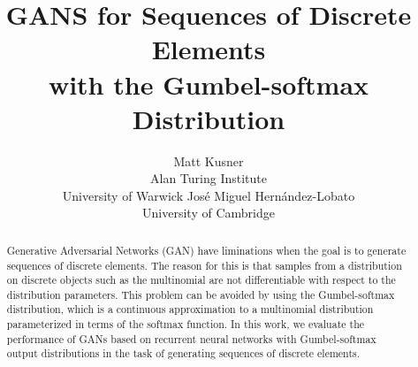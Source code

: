 \documentclass{article}
\title{GANS for Sequences of Discrete Elements \\with the Gumbel-softmax Distribution}
\author{
    Matt Kusner\\
    Alan Turing Institute\\
    University of Warwick
    \And
    Jos\'e Miguel Hern\'andez-Lobato\\
    University of Cambridge
}
\begin{document}

\maketitle

\begin{abstract}
Generative Adversarial Networks (GAN) have liminations when the goal is to
generate sequences of discrete elements. The reason for this is that
samples from a distribution on discrete objects such as the multinomial are
not differentiable with respect to the distribution parameters. This problem
can be avoided by using the Gumbel-softmax distribution, which is a continuous
approximation to a multinomial distribution parameterized in terms of the
softmax function. In this work, we evaluate the performance of GANs based on
recurrent neural networks with Gumbel-softmax output distributions in the task
of generating sequences of discrete elements.
\end{abstract}








\end{document}
